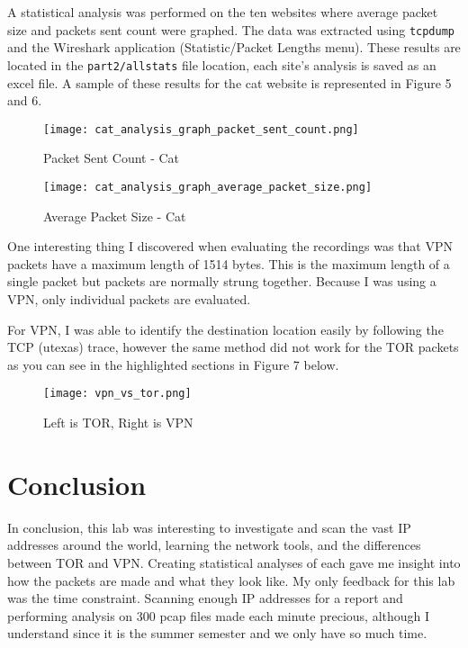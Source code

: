 \documentclass[11pt]{article}
\def\code#1{\texttt{#1}}
\begin{document}
A statistical analysis was performed on the ten websites where average packet size and packets sent count were graphed. The data was extracted using \code{tcpdump} and the Wireshark application (Statistic/Packet Lengths menu). These results are located in the \code{part2/all\textunderscore stats} file location, each site's analysis is saved as an excel file. A sample of these results for the cat website is represented in Figure 5 and 6.

\begin{figure}[H]
\begin{minipage}[t]{0.48\textwidth}
\texttt{[image: cat\_analysis\_graph\_packet\_sent\_count.png]}
\caption{Packet Sent Count - Cat}
\end{minipage}
\hspace*{\fill}
\begin{minipage}[t]{0.48\textwidth}
\texttt{[image: cat\_analysis\_graph\_average\_packet\_size.png]}
\caption{Average Packet Size - Cat}
\end{minipage}
\end{figure}

One interesting thing I discovered when evaluating the recordings was that VPN packets have a maximum length of 1514 bytes. This is the maximum length of a single packet but packets are normally strung together. Because I was using a VPN, only individual packets are evaluated.

For VPN, I was able to identify the destination location easily by following the TCP (utexas) trace, however the same method did not work for the TOR packets as you can see in the highlighted sections in Figure 7 below.

\begin{figure}[H]
\centering
\texttt{[image: vpn\_vs\_tor.png]}
\caption{Left is TOR, Right is VPN}
\end{figure}



\section{Conclusion}
\label{sec:conclusion}
In conclusion, this lab was interesting to investigate and scan the vast IP addresses around the world, learning the network tools, and the differences between TOR and VPN. Creating statistical analyses of each gave me insight into how the packets are made and what they look like. My only feedback for this lab was the time constraint. Scanning enough IP addresses for a report and performing analysis on 300 pcap files made each minute precious, although I understand since it is the summer semester and we only have so much time.




\end{document}
